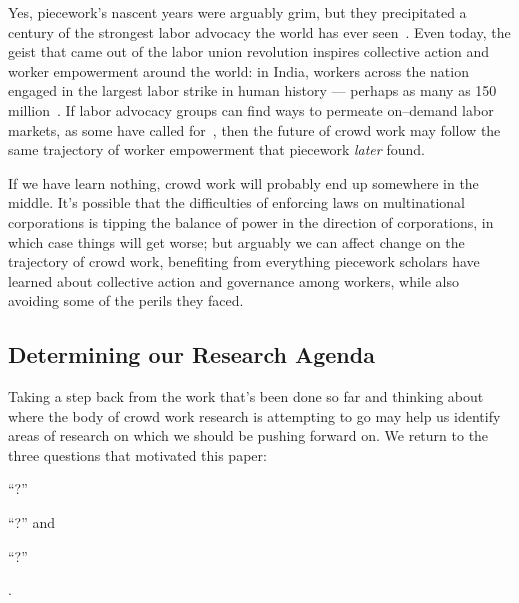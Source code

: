 \documentclass[trackingWork]{subfiles}
\begin{document}
Yes, piecework's nascent years were arguably grim, but
they precipitated a century of the strongest labor advocacy the world has ever seen~\cite{hart2013rise,mccallum2013global}.
Even today, the geist that came out of the labor union revolution
inspires collective action and worker empowerment around the world:
in India, workers across the nation engaged in
the largest labor strike in human history
--- perhaps as many as 150 million~\cite{indiaStrikeRealNews}.
If labor advocacy groups can find ways to permeate on--demand labor markets,
as some have called for~\cite{futureUnions},
then the future of crowd work may follow
the same trajectory of worker empowerment that piecework \textit{later} found.

If we have learn nothing, crowd work will probably end up somewhere in the middle.
It's possible that the difficulties of enforcing laws on multinational corporations is
tipping the balance of power in the direction of corporations, in which case
things will get worse;
but arguably we can affect change on the trajectory of crowd work,
benefiting from everything piecework scholars have learned about
collective action and governance
among workers, while also avoiding some of the perils they faced.



\subsection{Determining our Research Agenda}\label{sec:whatShouldBeTheFuture}
Taking a step back from the work that's been done so far and
thinking about where the body of crowd work research is attempting to go may help us identify
areas of research on which we should be pushing forward on.
We return to the three questions that motivated this paper:
\begin{inlinelist}
  \item ``?''
  \item ``?''
        and
  \item ``?''
\end{inlinelist}.
\end{document}
